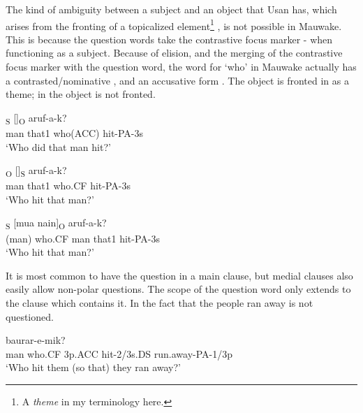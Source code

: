 The kind of ambiguity between a subject and an object that Usan has, which arises from the fronting of a topicalized element\footnote{A \textit{theme} in my terminology here.} \citep[294]{Reesink1987}, is not possible in Mauwake. This is because the question words take the contrastive focus marker \nobreakdash-  when functioning as a subject. Because of elision, and the merging of the contrastive focus marker with the question word, the word for `who' in Mauwake actually has a contrasted/nominative ,  and an accusative form . The object is fronted in  as a theme; in  the object is not fronted.

\ea%
\label{ex:x1170}
\textsubscript{S}  []\textsubscript{O}  aruf-a-k? \\
man  that1  who(ACC)  hit-PA-3s      \\
\glt `Who did that man hit?'
\z





\ea%
\label{ex:x1171}
\textsubscript{O}  []\textsubscript{S}  aruf-a-k? \\
man  that1  who.CF  hit-PA-3s      \\
\glt `Who hit that man?'
\z





\ea%
\label{ex:x1172}
\textsubscript{S}  [mua  nain]\textsubscript{O}  aruf-a-k? \\
(man)  who.CF  man  that1  hit-PA-3s      \\
\glt `Who hit that man?'
\z





It is most common to have the question in a main clause, but medial clauses also easily allow non-polar questions. The scope of the question word only extends to the clause which contains it. In  the fact that the people ran away is not questioned.

\ea%
\label{ex:x1168}
\gll {}        baurar-e-mik? \\
man  who.CF  3p.ACC  hit-2/3s.DS  run.away-PA-1/3p      \\
\glt `Who hit them (so that) they ran away?'
\z





